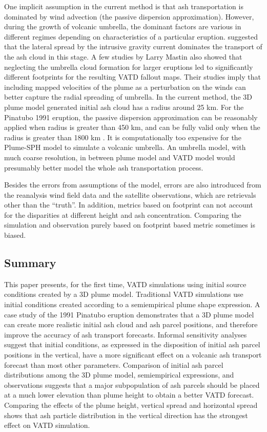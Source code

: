 \documentclass[utf8]{frontiersSCNS} %
\begin{document}
One implicit assumption in the current method is that ash transportation is dominated by wind advection (the passive dispersion approximation). However, during the growth of volcanic umbrella, the dominant factors are various in different regimes \citep{pouget2016interpretation} depending on characteristics of a particular eruption. \citet{webster2020operational} suggested that the lateral spread by the intrusive gravity current dominates the transport of the ash cloud in this stage. A few studies by Larry Mastin \citep{mastin2014modeling,mastin2020comparing} also showed that neglecting the umbrella cloud formation for larger eruptions led to significantly different footprints for the resulting VATD fallout maps. Their studies imply that including mapped velocities of the plume as a perturbation on the winds can better capture the radial spreading of umbrella. In the current method, the 3D plume model generated initial ash cloud has a radius around 25 km. For the Pinatubo 1991 eruption, the passive dispersion approximation can be reasonably applied when radius is greater than 450 km, and can be fully valid only when the radius is greater than 1800 km \citep{costa2013density}. It is computationally too expensive for the Plume-SPH model to simulate a volcanic umbrella. An umbrella model, with much coarse resolution, in between plume model and VATD model would presumably better model the whole ash transportation process.

Besides the errors from assumptions of the model, errors are also introduced from the reanalysis wind field data and the satellite observations, which are retrievals other than the ``truth”. In addition, metrics based on footprint can not account for the disparities at different height and ash concentration. Comparing the simulation and observation purely based on footprint based metric sometimes is biased.

\subsection{Summary}
This paper presents, for the first time, VATD simulations using initial source conditions created by a 3D plume model. Traditional VATD simulations use initial conditions created according to a semiempirical plume shape expression. A case study of the 1991 Pinatubo eruption demonstrates that a 3D plume model can create more realistic initial ash cloud and ash parcel positions, and therefore improve the accuracy of ash transport forecasts. Informal sensitivity analyses suggest that initial conditions, as expressed in the disposition of initial ash parcel positions in the vertical, have a more significant effect on a volcanic ash transport forecast than most other parameters. Comparison of initial ash parcel distributions among the 3D plume model, semiempirical expressions, and observations suggests that a major subpopulation of ash parcels should be placed at a much lower elevation than plume height to obtain a better VATD forecast. Comparing the effects of the plume height, vertical spread and horizontal spread shows that ash particle distribution in the vertical direction has the strongest effect on VATD simulation.
\end{document}
